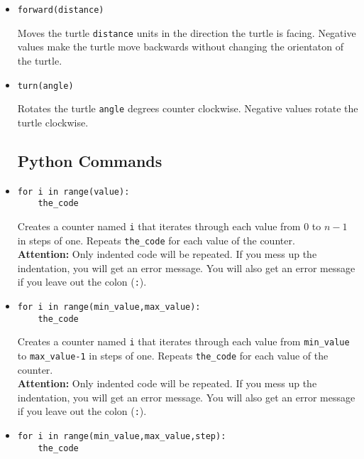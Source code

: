 \documentclass[11pt,a4paper]{report}
\begin{document}
\begin{itemize}
\item \begin{lstlisting}
forward(distance)
\end{lstlisting}

Moves the turtle \texttt{distance} units in the direction the turtle is facing. Negative values make the turtle move backwards without changing the orientaton of the turtle.

\item \begin{lstlisting}
turn(angle)
\end{lstlisting}

Rotates the turtle \texttt{angle} degrees counter clockwise. Negative values rotate the turtle clockwise. 


\newpage
\subsection{Python Commands}

\item \begin{lstlisting}
for i in range(value):
	the_code
\end{lstlisting}

Creates a \gls{counter} named \texttt{i} that iterates through each value from $0$ to $n-1$ in steps of one. Repeats \texttt{the\_code} for each value of the counter.\\
 {\bf Attention:} Only indented code will be repeated. If you mess  up the indentation, you will get an error message.  You will also get an error message if you leave out the colon (\texttt{:}).

\item \begin{lstlisting}
for i in range(min_value,max_value):
	the_code
\end{lstlisting}

Creates a \gls{counter} named \texttt{i} that iterates through each value from \texttt{min\_value} to \texttt{max\_value-1} in steps of one. Repeats \texttt{the\_code} for each value of the counter. \\
 {\bf Attention:} Only indented code will be repeated. If you mess  up the indentation, you will get an error message. You will also get an error message if you leave out the colon (\texttt{:}).

\item \begin{lstlisting}
for i in range(min_value,max_value,step):
	the_code
\end{lstlisting}


\end{itemize}
\end{document}
